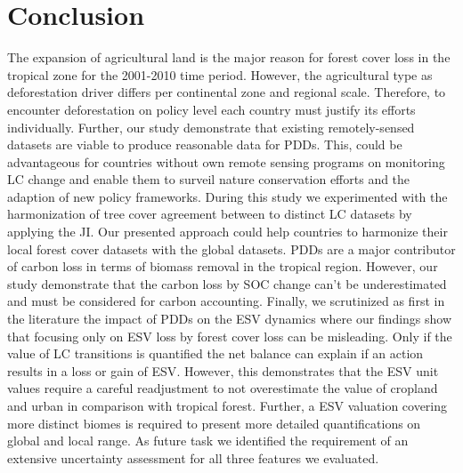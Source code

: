 \chapter{Conclusion}
\label{ch:conclusion}
	The expansion of agricultural land is the major reason for forest cover loss in the tropical zone for the 2001-2010 time period. However, the agricultural type as deforestation driver differs per continental zone and regional scale. Therefore, to encounter deforestation on policy level each country must justify its efforts individually. Further, our study demonstrate that existing remotely-sensed datasets are viable to produce reasonable data for \acp{PDD}. This, could be advantageous for countries without own remote sensing programs on monitoring \ac{LC} change and enable them to surveil nature conservation efforts and the adaption of new policy frameworks. During this study we experimented with the harmonization of tree cover agreement between to distinct \ac{LC} datasets by applying the \ac{JI}. Our presented approach could help countries to harmonize their local forest cover datasets with the global datasets. \acp{PDD} are a major contributor of carbon loss in terms of biomass removal in the tropical region. However, our study demonstrate that the carbon loss by \ac{SOC} change can't be underestimated and must be considered for carbon accounting. Finally, we scrutinized as first in the literature the impact of \acp{PDD} on the \ac{ESV} dynamics where our findings show that focusing only on \ac{ESV} loss by forest cover loss can be misleading. Only if the value of \ac{LC} transitions is quantified the net balance can explain if an action results in a loss or gain of \ac{ESV}. However, this demonstrates that the \ac{ESV} unit values require a careful readjustment to not overestimate the value of cropland and urban in comparison with tropical forest. Further, a \ac{ESV} valuation covering more distinct biomes is required to present more detailed quantifications on global and local range. As future task we identified the requirement of an extensive uncertainty assessment for all three features we evaluated.


